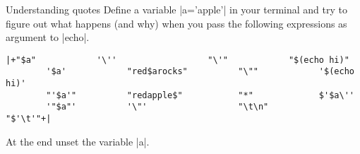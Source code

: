 
\begin{exercise}[Instructive]{Understanding quotes}
    Define a variable \bash|a='apple'| in your terminal and try to figure out what happens (and why) when you pass the following expressions as argument to \bash|echo|.
    \begin{lstlisting}[style=MyBash, moredelim={[is][\color{strings-color}]{|+}{+|}}]
        |+"$a"            '\''                  "\'"            "$(echo hi)"
        '$a'            "red$arocks"          "\""            '$(echo hi)'
        "'$a'"          "redapple$"           "*"             $'$a\''
        '"$a"'          '\"'                  "\t\n"          "$'\t'"+|
    \end{lstlisting}
    At the end unset the variable \bash|a|.
\end{exercise}
